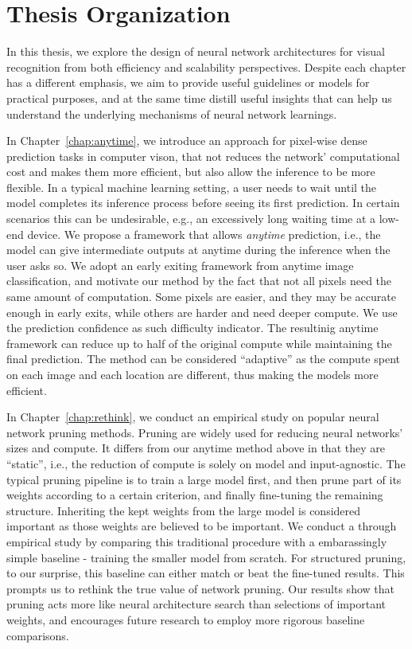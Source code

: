 \documentclass{ucbthesis}
\begin{document}
\section{Thesis Organization}
In this thesis, we explore the design of neural network architectures for visual recognition from both efficiency and scalability perspectives. Despite each chapter has a different emphasis, we aim to provide useful guidelines or models for practical purposes, and at the same time distill useful insights that can help us understand the underlying mechanisms of neural network learnings. 

In Chapter~\ref{chap:anytime}, we introduce an approach for pixel-wise dense prediction tasks in computer vison, that not reduces the network' computational cost and makes them more efficient, but also allow the inference to be more flexible. In a typical machine learning setting, a user needs to wait until the model completes its inference process before seeing its first prediction. In certain scenarios this can be undesirable, e.g., an excessively long waiting time at a low-end device. We propose a framework that allows \emph{anytime} prediction, i.e., the model can give intermediate outputs at anytime during the inference when the user asks so. We adopt an early exiting framework from anytime image classification, and motivate our method by the fact that not all pixels need the same amount of computation. Some pixels are easier, and they may be accurate enough in early exits, while others are harder and need deeper compute. We use the prediction confidence as such difficulty indicator. The resultinig anytime framework can reduce up to half of the original compute while maintaining the final prediction. The method can be considered ``adaptive'' as the compute spent on each image and each location are different, thus making the models more efficient.

In Chapter~\ref{chap:rethink}, we conduct an empirical study on popular neural network pruning methods. Pruning are widely used for reducing neural networks' sizes and compute. It differs from our anytime method above in that they are ``static'', i.e., the reduction of compute is solely on model and input-agnostic. The typical pruning pipeline is to train a large model first, and then prune part of its weights according to a certain criterion, and finally fine-tuning the remaining structure. Inheriting the kept weights from the large model is considered important as those weights are believed to be important. We conduct a through empirical study by comparing this traditional procedure with a embarassingly simple baseline - training the smaller model from scratch. For structured pruning, to our surprise, this baseline can either match or beat the fine-tuned results. This prompts us to rethink the true value of network pruning. Our results show that pruning acts more like neural architecture search than selections of important weights, and encourages future research to employ more rigorous baseline comparisons.
\end{document}
